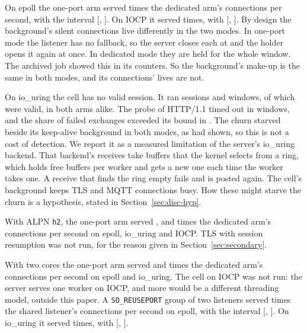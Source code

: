  On epoll the one-port arm served \SecMixedSecMixedCOneLEpollValueMedian{}
times the dedicated arm's connections per second, with the interval
[\SecMixedSecMixedCOneLEpollValueLow, \SecMixedSecMixedCOneLEpollValueHigh]. On IOCP it served
\SecMixedSecMixedCOneWIocpValueMedian{} times, with [\SecMixedSecMixedCOneWIocpValueLow,
\SecMixedSecMixedCOneWIocpValueHigh]. By design the background's silent connections live
differently in the two modes. In one-port mode the listener has no fallback, so the server closes
each at \Tdec{} and the holder opens it again at once. In dedicated mode they are held for the whole
window. The archived job \JobSlOne{} showed this in its counters. So the background's make-up is the
same in both modes, and its connections' lives are not.

On io\_uring the cell has no valid session. It ran \CountMixedIouringSessions{} sessions and
\CountMixedIouringWindows{} windows, of which \CountMixedIouringValid{} were valid, in both arms
alike. The probe of HTTP/1.1 timed out in \CountMixedIouringProbe{} windows, and the share of failed
exchanges exceeded its bound in \CountMixedIouringErrors. The churn starved beside its keep-alive
background in both modes, as \JobSlOne{} had shown, so this is not a cost of detection. We report it
as a measured limitation of the server's io\_uring backend. That backend's receives take buffers
that the kernel selects from a ring, which holds \RingBuffers{} free buffers per worker and gets a
new one each time the worker takes one. A receive that finds the ring empty fails and is posted
again. The cell's background keeps \NBg{} TLS and \NBg{} MQTT connections busy. How these might
starve the churn is a hypothesis, stated in Section~\ref{sec:disc-hyp}.

 With ALPN \texttt{h2}, the one-port arm served \SecTlsVariantsSecTlsVariantsCOneLEpollAlpnHTwoValueMedian,
\SecTlsVariantsSecTlsVariantsCOneLIouringAlpnHTwoValueMedian{} and
\SecTlsVariantsSecTlsVariantsCOneWIocpAlpnHTwoValueMedian{} times the dedicated arm's connections per
second on epoll, io\_uring and IOCP. TLS with session resumption was not run, for the reason given in
Section~\ref{sec:secondary}.

 With two cores the one-port arm served \SecTwoCoresSecTwoCoresCOneLEpollTwoCoresValueMedian{}
and \SecTwoCoresSecTwoCoresCOneLIouringTwoCoresValueMedian{} times the dedicated arm's connections
per second on epoll and io\_uring. The cell on IOCP was not run: the server serves one worker on
IOCP, and more would be a different threading model, outside this paper. A
\texttt{SO\_REUSEPORT} group of two listeners served \SecTwoCoresSecTwoCoresCOneLEpollReuseportValueMedian{}
times the shared listener's connections per second on epoll, with the interval
[\SecTwoCoresSecTwoCoresCOneLEpollReuseportValueLow, \SecTwoCoresSecTwoCoresCOneLEpollReuseportValueHigh].
On io\_uring it served \SecTwoCoresSecTwoCoresCOneLIouringReuseportValueMedian{} times, with
[\SecTwoCoresSecTwoCoresCOneLIouringReuseportValueLow, \SecTwoCoresSecTwoCoresCOneLIouringReuseportValueHigh].

